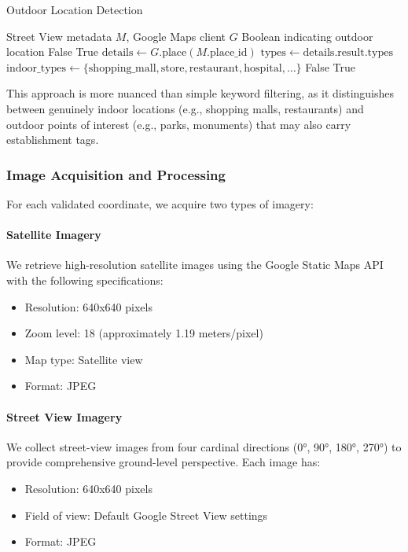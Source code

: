 \begin{algorithm}[t]
\caption{Outdoor Location Detection}
\label{alg:outdoor_detection}
\begin{algorithmic}[1]
\Require Street View metadata $M$, Google Maps client $G$
\Ensure Boolean indicating outdoor location
    \State \Return False
\EndIf
{}
    \State \Return True 
\EndIf
\State $\mathrm{details} \gets G.\mathrm{place}(M.\mathrm{place\_id})$
\State $\mathrm{types} \gets \mathrm{details.result.types}$
\State $\mathrm{indoor\_types} \gets \{\mathrm{shopping\_mall}, \mathrm{store}, \mathrm{restaurant}, \mathrm{hospital}, \ldots\}$
    \State \Return False
\Else
    \State \Return True
\EndIf
\end{algorithmic}
\end{algorithm}

This approach is more nuanced than simple keyword filtering, as it distinguishes between genuinely indoor locations (e.g., shopping malls, restaurants) and outdoor points of interest (e.g., parks, monuments) that may also carry establishment tags.

\subsubsection{Image Acquisition and Processing}

For each validated coordinate, we acquire two types of imagery:

\paragraph{Satellite Imagery} We retrieve high-resolution satellite images using the Google Static Maps API with the following specifications:
\begin{itemize}
    \item Resolution: 640x640 pixels
    \item Zoom level: 18 (approximately 1.19 meters/pixel)
    \item Map type: Satellite view
    \item Format: JPEG
\end{itemize}

\paragraph{Street View Imagery} We collect street-view images from four cardinal directions (0°, 90°, 180°, 270°) to provide comprehensive ground-level perspective. Each image has:
\begin{itemize}
    \item Resolution: 640x640 pixels
    \item Field of view: Default Google Street View settings
    \item Format: JPEG
\end{itemize}

